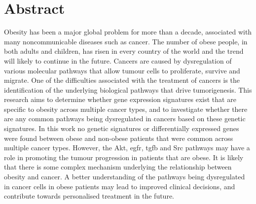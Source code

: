 \vspace*{\fill}

\section*{\centering Abstract}

Obesity has been a major global problem for more than a decade, associated with many noncommunicable diseases such as  cancer.
The number of obese people, in both adults and children, has risen in every country of the world and the trend will likely to continue in the future.
Cancers are caused by dysregulation of various molecular pathways that allow tumour cells to proliferate, survive and migrate.
One of the difficulties associated with the treatment of cancers is the identification of the underlying biological pathways that drive tumorigenesis.
This research aims to determine whether gene expression signatures exist  that are specific to obesity across multiple cancer types, and to investigate whether there are any common pathways being dysregulated in cancers based on these genetic signatures.
In this work no genetic signatures or differentially expressed genes were found between obese and non-obese patients that were common across multiple cancer types.
However, the Akt, \gls{egfr}, \gls{tgfb} and Src pathways may have a role in promoting the tumour progression in patients that are obese.
It is likely that there is some complex mechanism underlying the relationship between obesity and cancer.
A better understanding of the pathways being dysregulated in cancer cells in obese patients may lead to improved clinical decisions, and contribute towards personalised treatment in the future.

\vfill
